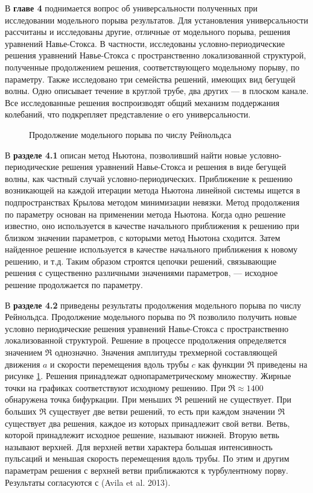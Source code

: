 В \textbf{главе 4} поднимается вопрос об универсальности полученных при исследовании модельного порыва результатов. Для установления универсальности рассчитаны и исследованы другие, отличные от модельного порыва, решения уравнений Навье-Стокса. В частности, исследованы условно-периодические решения уравнений Навье-Стокса с пространственно локализованной структурой, полученные продолжением решения, соответствующего модельному порыву, по параметру. Также исследовано три семейства решений, имеющих вид бегущей волны. Одно описывает течение в круглой трубе, два других --- в плоском канале. Все исследованные решения воспроизводят общий механизм поддержания колебаний, что подкрепляет представление о его универсальности.

\begin{figure}
\caption{Продолжение модельного порыва по числу Рейнольдса}
\label{contin_pic}
\end{figure} 

В \textbf{разделе 4.1} описан метод Ньютона, позволивший найти новые условно-периодические решения уравнений Навье-Стокса и решения в виде бегущей волны, как частный случай условно-периодических. Приближение к решению возникающей на каждой итерации метода Ньютона линейной системы ищется в подпространствах Крылова методом минимизации невязки. %
Метод продолжения по параметру основан на применении метода Ньютона. Когда одно решение известно, оно используется в качестве начального приближения к решению при близком значении параметров, с которыми метод Ньютона сходится. Затем найденное решение используется в качестве начального приближения к новому решению, и т.д. Таким образом строятся цепочки решений, связывающие решения с существенно различными значениями параметров, --- исходное решение продолжается по параметру.


В \textbf{разделе 4.2} приведены результаты продолжения модельного порыва по числу Рейнольдса. Продолжение модельного порыва по $\Re$ позволило получить новые условно периодические решения уравнений Навье-Стокса с пространственно локализованной структурой. Решение в процессе продолжения определяется значением $\Re$ однозначно. Значения амплитуды трехмерной составляющей движения $a$ и скорости перемещения вдоль трубы $c$ как функции $\Re$ приведены на рисунке \ref{contin_pic}. Решения принадлежат однопараметрическому множеству. Жирные точки на графиках соответствуют исходному решению. При $\Re \approx 1400$ обнаружена точка бифуркации. При меньших $\Re$ решений не существует. При больших $\Re$ существует две ветви решений, то есть при каждом значении $\Re$ существует два решения, каждое из которых принадлежит свой ветви. Ветвь, которой принадлежит исходное решение, называют нижней. Вторую ветвь называют верхней. Для верхней ветви характера большая интенсивность пульсаций и меньшая скорость перемещения вдоль трубы. По этим и другим параметрам решения с верхней ветви приближаются к турбулентному порву. Результаты согласуются с (Avila et al. 2013). 

